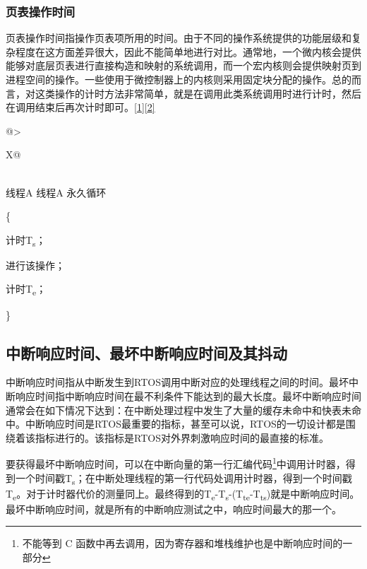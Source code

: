 \subsubsection{页表操作时间}\label{subsubsec:1-page-table-operation-time}

页表操作时间指操作页表项所用的时间。由于不同的操作系统提供的功能层级和复杂程度在这方面差异很大，因此不能简单地进行对比。通常地，一个微内核会提供能够对底层页表进行直接构造和映射的系统调用，而一个宏内核则会提供映射页到进程空间的操作。一些使用于微控制器上的内核则采用固定块分配的操作。总的而言，对这类操作的计时方法非常简单，就是在调用此类系统调用时进行计时，然后在调用结束后再次计时即可。\hyperref[cite:1-1]{{[}1{]}}\hyperref[cite:1-2]{{[}2{]}}

\begin{xltabular}{\textwidth}{@{}>{\hsize\raggedright\arraybackslash}X@{}}
\caption{页表操作}\label{tab:1-11-page-table-operations}\\
\toprule
线程A\tabularnewline
\endfirsthead
\toprule
线程A\tabularnewline
\midrule
\endhead
\bottomrule
\endlastfoot
永久循环

\{

计时T\textsubscript{s}；

进行该操作；

计时T\textsubscript{e}；

\}\strut
\tabularnewline
\end{xltabular}

\subsection{中断响应时间、最坏中断响应时间及其抖动}\label{subsec:1-interrupt-response-time-and-jitter}

中断响应时间指从中断发生到RTOS调用中断对应的处理线程之间的时间。最坏中断响应时间指中断响应时间在最不利条件下能达到的最大长度。最坏中断响应时间通常会在如下情况下达到：在中断处理过程中发生了大量的缓存未命中和快表未命中。中断响应时间是RTOS最重要的指标，甚至可以说，RTOS的一切设计都是围绕着该指标进行的。该指标是RTOS对外界刺激响应时间的最直接的标准。

要获得最坏中断响应时间，可以在中断向量的第一行汇编代码\footnote{不能等到 C 函数中再去调用，因为寄存器和堆栈维护也是中断响应时间的一部分}中调用计时器，得到一个时间戳T\textsubscript{s}；在中断处理线程的第一行代码处调用计时器，得到一个时间戳T\textsubscript{e}。对于计时器代价的测量同上。最终得到的T\textsubscript{e}-T\textsubscript{s}-(T\textsubscript{te}-T\textsubscript{ts})就是中断响应时间。最坏中断响应时间，就是所有的中断响应测试之中，响应时间最大的那一个。

